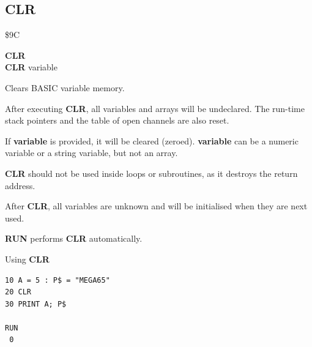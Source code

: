 \subsection{CLR}
\begin{description}[leftmargin=2cm,style=nextline]
\item [Token:]   \$9C

\item [Format:]  {\bf CLR} \\
                 {\bf CLR} variable

\item [Usage:]   Clears BASIC variable memory.

                 After executing {\bf CLR}, all variables and arrays will be undeclared. The run-time stack pointers and the table of open channels are also reset.

                 If {\bf variable} is provided, it will be cleared (zeroed). {\bf variable} can be a numeric variable or a string variable, but not an array.

\item [Remarks:] {\bf CLR} should not be used inside loops or subroutines, as it destroys the return address.

                 After {\bf CLR}, all variables are unknown and will be initialised when they are next used.

                 {\bf RUN} performs {\bf CLR} automatically.

\item [Example:] Using {\bf CLR}

\begin{tcolorbox}[colback=black,coltext=white]
\verbatimfont{\codefont}
\begin{verbatim}
10 A = 5 : P$ = "MEGA65"
20 CLR
30 PRINT A; P$

RUN
 0
\end{verbatim}
\end{tcolorbox}
\end{description}


\newpage
